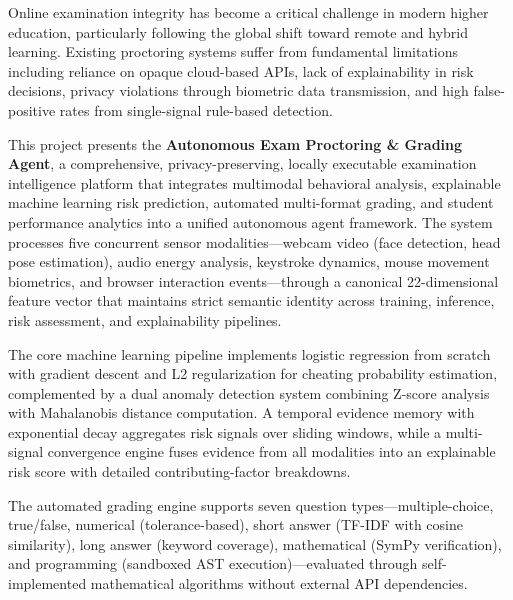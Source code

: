 \documentclass{article}
\begin{document}
\large{
Online examination integrity has become a critical challenge in modern higher education, particularly following the global shift toward remote and hybrid learning. Existing proctoring systems suffer from fundamental limitations including reliance on opaque cloud-based APIs, lack of explainability in risk decisions, privacy violations through biometric data transmission, and high false-positive rates from single-signal rule-based detection.

\vspace{0.3cm}

This project presents the \textbf{Autonomous Exam Proctoring \& Grading Agent}, a comprehensive, privacy-preserving, locally executable examination intelligence platform that integrates multimodal behavioral analysis, explainable machine learning risk prediction, automated multi-format grading, and student performance analytics into a unified autonomous agent framework. The system processes five concurrent sensor modalities---webcam video (face detection, head pose estimation), audio energy analysis, keystroke dynamics, mouse movement biometrics, and browser interaction events---through a canonical 22-dimensional feature vector that maintains strict semantic identity across training, inference, risk assessment, and explainability pipelines.

\vspace{0.3cm}

The core machine learning pipeline implements logistic regression from scratch with gradient descent and L2 regularization for cheating probability estimation, complemented by a dual anomaly detection system combining Z-score analysis with Mahalanobis distance computation. A temporal evidence memory with exponential decay aggregates risk signals over sliding windows, while a multi-signal convergence engine fuses evidence from all modalities into an explainable risk score with detailed contributing-factor breakdowns.

\vspace{0.3cm}

The automated grading engine supports seven question types---multiple-choice, true/false, numerical (tolerance-based), short answer (TF-IDF with cosine similarity), long answer (keyword coverage), mathematical (SymPy verification), and programming (sandboxed AST execution)---evaluated through self-implemented mathematical algorithms without external API dependencies.

\vspace{0.3cm}

}
\end{document}
